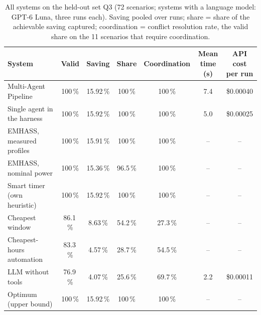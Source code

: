 \documentclass[12pt,a4paper]{report}
\begin{document}
\begin{table}[h!]
\caption{All systems on the held-out set Q3 (72 scenarios; systems with a language model: GPT-6 Luna, three runs each). Saving pooled over runs; share = share of the achievable saving captured; coordination = conflict resolution rate, the valid share on the 11 scenarios that require coordination.}
\label{tab:q3-systems}
\footnotesize
\begin{tabular*}{\textwidth}{@{\extracolsep{\fill}}lcccccc}
\toprule
System & Valid & Saving & Share & Coordination & \makecell{Mean\\time (s)} & \makecell{API cost\\per run} \\
\midrule
Multi-Agent Pipeline & 100\,\% & 15.92\,\% & 100\,\% & 100\,\% & 7.4 & \$0.00040 \\
Single agent in the harness & 100\,\% & 15.92\,\% & 100\,\% & 100\,\% & 5.0 & \$0.00025 \\
EMHASS, measured profiles & 100\,\% & 15.91\,\% & 100\,\% & 100\,\% & -- & -- \\
EMHASS, nominal power & 100\,\% & 15.36\,\% & 96.5\,\% & 100\,\% & -- & -- \\
Smart timer (own heuristic) & 100\,\% & 15.92\,\% & 100\,\% & 100\,\% & -- & -- \\
Cheapest window & 86.1\,\% & 8.63\,\% & 54.2\,\% & 27.3\,\% & -- & -- \\
Cheapest-hours automation & 83.3\,\% & 4.57\,\% & 28.7\,\% & 54.5\,\% & -- & -- \\
LLM without tools & 76.9\,\% & 4.07\,\% & 25.6\,\% & 69.7\,\% & 2.2 & \$0.00011 \\
\midrule
Optimum (upper bound) & 100\,\% & 15.92\,\% & 100\,\% & 100\,\% & -- & -- \\
\bottomrule
\end{tabular*}
\end{table}
\end{document}
